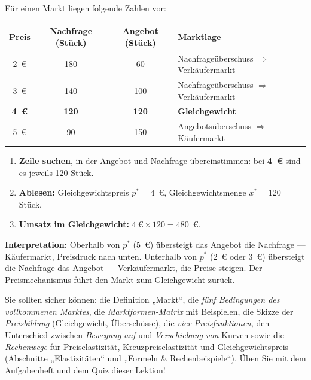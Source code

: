 \documentclass[11pt, a4paper]{article}
\begin{document}
\begin{beispiel}
Für einen Markt liegen folgende Zahlen vor:

\begin{center}
\begin{tabular}{cccl}
\textbf{Preis} & \textbf{Nachfrage (Stück)} & \textbf{Angebot (Stück)} & \textbf{Marktlage}\\
\hline
2~€ & 180 & 60  & Nachfrageüberschuss $\Rightarrow$ Verkäufermarkt\\
3~€ & 140 & 100 & Nachfrageüberschuss $\Rightarrow$ Verkäufermarkt\\
\textbf{4~€} & \textbf{120} & \textbf{120} & \textbf{Gleichgewicht}\\
5~€ & 90  & 150 & Angebotsüberschuss $\Rightarrow$ Käufermarkt\\
\end{tabular}
\end{center}

\begin{enumerate}
  \item \textbf{Zeile suchen}, in der Angebot und Nachfrage übereinstimmen: bei
    \textbf{4~€} sind es jeweils 120 Stück.
  \item \textbf{Ablesen:} Gleichgewichtspreis $p^* = 4$~€, Gleichgewichtsmenge
    $x^* = 120$ Stück.
  \item \textbf{Umsatz im Gleichgewicht:} $4~\text{€} \times 120 = 480$~€.
\end{enumerate}
\textbf{Interpretation:} Oberhalb von $p^*$ (5~€) übersteigt das Angebot die Nachfrage
--- Käufermarkt, Preisdruck nach unten. Unterhalb von $p^*$ (2~€ oder 3~€) übersteigt
die Nachfrage das Angebot --- Verkäufermarkt, die Preise steigen. Der Preismechanismus
führt den Markt zum Gleichgewicht zurück.
\end{beispiel}

\begin{merksatz}[title={\bfseries Wichtig für die Prüfungsvorbereitung}]
Sie sollten sicher können: die Definition „Markt``, die \emph{fünf Bedingungen des
vollkommenen Marktes}, die \emph{Marktformen-Matrix} mit Beispielen, die Skizze der
\emph{Preisbildung} (Gleichgewicht, Überschüsse), die \emph{vier Preisfunktionen},
den Unterschied zwischen \emph{Bewegung auf} und \emph{Verschiebung von} Kurven sowie
die \emph{Rechenwege} für Preiselastizität, Kreuzpreiselastizität und Gleichgewichtspreis
(Abschnitte „Elastizitäten`` und „Formeln \& Rechenbeispiele``).
Üben Sie mit dem Aufgabenheft und dem Quiz dieser Lektion!
\end{merksatz}
\end{document}
